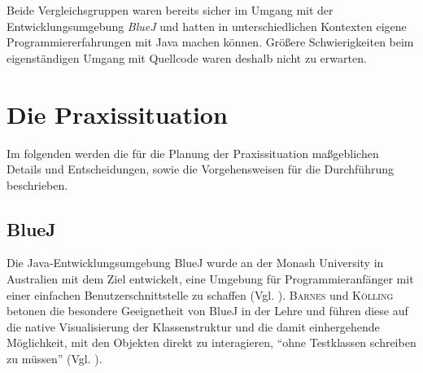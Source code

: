\documentclass[paper=a4, DIV=13, BCOR=12mm, twoside=on, onecolumn=on, open = any, titlepage =on, parskip =half-, headsepline = on, footsepline = on, chapterprefix = on, sectionprefix = on, appendixprefix = off, fontsize = 11pt, numbers = noenddot, abstract = off]{scrreprt}
\begin{document}
Beide Vergleichsgruppen waren bereits sicher im Umgang mit der Entwicklungsumgebung \emph{BlueJ} und hatten in unterschiedlichen Kontexten eigene Programmiererfahrungen mit Java machen können. Größere Schwierigkeiten beim eigenständigen Umgang mit Quellcode waren deshalb nicht zu erwarten.

\chapter{Die Praxissituation}
\onehalfspacing
 Im folgenden werden die für die Planung der Praxissituation maßgeblichen Details und Entscheidungen, sowie die Vorgehensweisen für die Durchführung beschrieben. 
\par \singlespacing
 \section{BlueJ}
\onehalfspacing
{}
\label{sec:bluej}
Die Java-Entwicklungsumgebung BlueJ wurde an der Monash University in Australien mit dem Ziel entwickelt, eine Umgebung für Programmieranfänger mit einer einfachen Benutzerschnittstelle zu schaffen (Vgl. \cite[S.14]{barnes:03}). \textsc{Barnes} und \textsc{Kölling} betonen die besondere Geeignetheit von BlueJ in der Lehre und führen diese auf die native Visualisierung der Klassenstruktur und die damit einhergehende Möglichkeit, mit den Objekten direkt zu interagieren, "`ohne Testklassen schreiben zu müssen"' (Vgl. \cite[S.15]{barnes:03}). 


\end{document}
